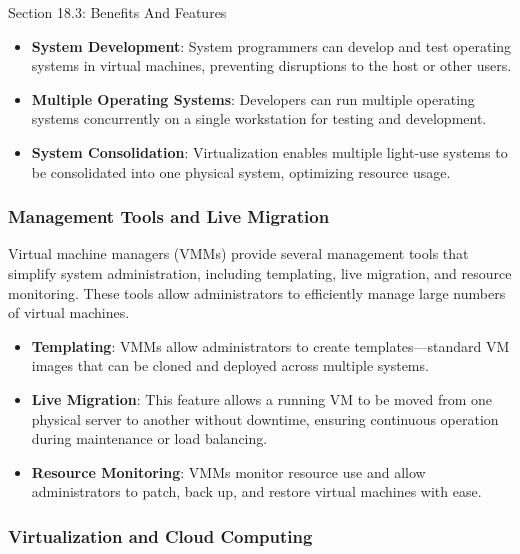 \begin{notes}{Section 18.3: Benefits And Features}
\begin{highlight}
        \begin{itemize}
            \item \textbf{System Development}: System programmers can develop and test operating systems in virtual machines, preventing disruptions to the host or other users.
            \item \textbf{Multiple Operating Systems}: Developers can run multiple operating systems concurrently on a single workstation for testing and development.
            \item \textbf{System Consolidation}: Virtualization enables multiple light-use systems to be consolidated into one physical system, optimizing resource usage.
        \end{itemize}
    
    \end{highlight}
    
    \subsubsection*{Management Tools and Live Migration}
    
    Virtual machine managers (VMMs) provide several management tools that simplify system administration, including templating, live migration, and resource monitoring. These tools allow administrators 
    to efficiently manage large numbers of virtual machines.
    
    \begin{highlight}
    
        \begin{itemize}
            \item \textbf{Templating}: VMMs allow administrators to create templates—standard VM images that can be cloned and deployed across multiple systems.
            \item \textbf{Live Migration}: This feature allows a running VM to be moved from one physical server to another without downtime, ensuring continuous operation during maintenance or load balancing.
            \item \textbf{Resource Monitoring}: VMMs monitor resource use and allow administrators to patch, back up, and restore virtual machines with ease.
        \end{itemize}
    
    \end{highlight}
    
    \subsubsection*{Virtualization and Cloud Computing}
    

\end{notes}
